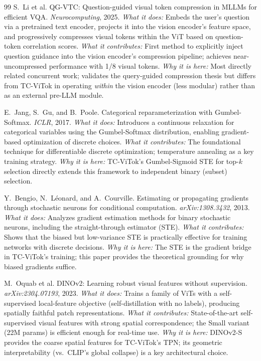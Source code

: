 \documentclass[11pt,twocolumn]{article}
\begin{document}
\begin{thebibliography}{99}
S.~Li et al.
\newblock QG-VTC: Question-guided visual token compression in MLLMs for efficient VQA.
\newblock \textit{Neurocomputing}, 2025.
\newblock \textit{What it does:} Embeds the user's question via a pretrained text encoder, projects it into the vision encoder's feature space, and progressively compresses visual tokens within the ViT based on question-token correlation scores.
\newblock \textit{What it contributes:} First method to explicitly inject question guidance into the vision encoder's compression pipeline; achieves near-uncompressed performance with 1/8 visual tokens.
\newblock \textit{Why it is here:} Most directly related concurrent work; validates the query-guided compression thesis but differs from TC-ViTok in operating \emph{within} the vision encoder (less modular) rather than as an external pre-LLM module.

E.~Jang, S.~Gu, and B.~Poole.
\newblock Categorical reparameterization with Gumbel-Softmax.
\newblock \textit{ICLR}, 2017.
\newblock \textit{What it does:} Introduces a continuous relaxation for categorical variables using the Gumbel-Softmax distribution, enabling gradient-based optimization of discrete choices.
\newblock \textit{What it contributes:} The foundational technique for differentiable discrete optimization; temperature annealing as a key training strategy.
\newblock \textit{Why it is here:} TC-ViTok's Gumbel-Sigmoid STE for top-$k$ selection directly extends this framework to independent binary (subset) selection.

Y.~Bengio, N.~L\'{e}onard, and A.~Courville.
\newblock Estimating or propagating gradients through stochastic neurons for conditional computation.
\newblock \textit{arXiv:1308.3432}, 2013.
\newblock \textit{What it does:} Analyzes gradient estimation methods for binary stochastic neurons, including the straight-through estimator (STE).
\newblock \textit{What it contributes:} Shows that the biased but low-variance STE is practically effective for training networks with discrete decisions.
\newblock \textit{Why it is here:} The STE is the gradient bridge in TC-ViTok's training; this paper provides the theoretical grounding for why biased gradients suffice.

M.~Oquab et al.
\newblock DINOv2: Learning robust visual features without supervision.
\newblock \textit{arXiv:2304.07193}, 2023.
\newblock \textit{What it does:} Trains a family of ViTs with a self-supervised local-feature objective (self-distillation with no labels), producing spatially faithful patch representations.
\newblock \textit{What it contributes:} State-of-the-art self-supervised visual features with strong spatial correspondence; the Small variant (22M params) is efficient enough for real-time use.
\newblock \textit{Why it is here:} DINOv2-S provides the coarse spatial features for TC-ViTok's TPN; its geometric interpretability (vs.\ CLIP's global collapse) is a key architectural choice.


\end{thebibliography}
\end{document}
